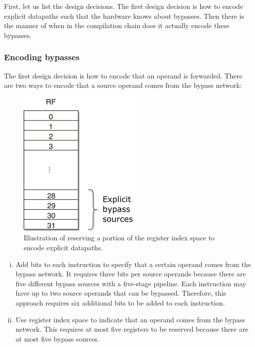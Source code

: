 
First, let us list the design decisions. The first design decision is how to encode explicit datapaths such that the hardware knows about bypasses. Then there is the manner of when in the compilation chain does it actually encode these bypasses.



\subsubsection{Encoding bypasses}
The first design decision is how to encode that an operand is forwarded. There are two ways to encode that a source operand comes from the bypass network:
\begin{figure}[b!]
\centering
\includegraphics[width=.225\textwidth]{figures/encoding}
\caption{Illustration of reserving a portion of the register index space to encode explicit datapaths.}
\label{fig:rf_index_space}
\end{figure}

\begin{enumerate}[i.]
  \item Add bits to each instruction to specify that a certain operand comes from the bypass network. It requires three bits per source operands because there are five different bypass sources with a five-stage pipeline. Each instruction may have up to two source operands that can be bypassed. Therefore, this approach requires six additional bits to be added to each instruction.
  \item Use register index space to indicate that an operand comes from the bypass network. This requires at most five registers to be reserved because there are at most five bypass sources.
\end{enumerate} 

